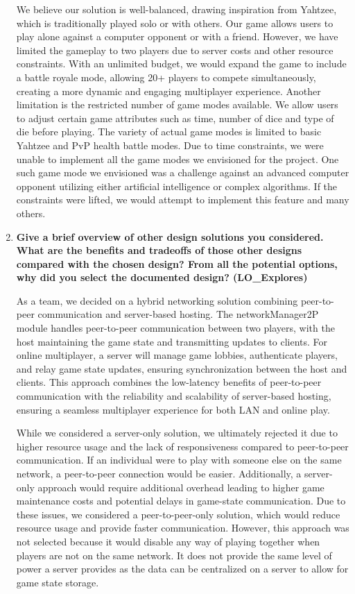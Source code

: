 \documentclass[12pt, titlepage]{article}
\begin{document}
\begin{enumerate}
  We believe our solution is well-balanced, drawing inspiration from Yahtzee, which is traditionally played solo or with others. Our game allows users to play alone against a computer opponent or with a friend. However, we have limited the gameplay to two players due to server costs and other resource constraints. With an unlimited budget, we would expand the game to include a battle royale mode, allowing 20+ players to compete simultaneously, creating a more dynamic and engaging multiplayer experience. Another limitation is the restricted number of game modes available. We allow users to adjust certain game attributes such as time, number of dice and type of die before playing. The variety of actual game modes is limited to basic Yahtzee and PvP health battle modes. Due to time constraints, we were unable to implement all the game modes we envisioned for the project. One such game mode we envisioned was a challenge against an advanced computer opponent utilizing either artificial intelligence or complex algorithms. If the constraints were lifted, we would attempt to implement this feature and many others.
  
  \item \textbf{Give a brief overview of other design solutions you considered.  What
  are the benefits and tradeoffs of those other designs compared with the chosen
  design?  From all the potential options, why did you select the documented design?
  (LO\_Explores)}

  As a team, we decided on a hybrid networking solution combining peer-to-peer communication and server-based hosting. The networkManager2P module handles peer-to-peer communication between two players, with the host maintaining the game state and transmitting updates to clients. For online multiplayer, a server will manage game lobbies, authenticate players, and relay game state updates, ensuring synchronization between the host and clients. This approach combines the low-latency benefits of peer-to-peer communication with the reliability and scalability of server-based hosting, ensuring a seamless multiplayer experience for both LAN and online play.

  While we considered a server-only solution, we ultimately rejected it due to higher resource usage and the lack of responsiveness compared to peer-to-peer communication. If an individual were to play with someone else on the same network, a peer-to-peer connection would be easier. Additionally, a server-only approach would require additional overhead leading to higher game maintenance costs and potential delays in game-state communication. Due to these issues, we considered a peer-to-peer-only solution, which would reduce resource usage and provide faster communication. However, this approach was not selected because it would disable any way of playing together when players are not on the same network. It does not provide the same level of power a server provides as the data can be centralized on a server to allow for game state storage. 


\end{enumerate}
\end{document}
